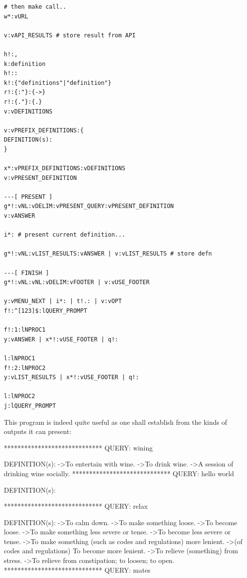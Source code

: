 \documentclass[a4paper, 18pt]{book} %
\begin{document}
{{{\begin{tcolorbox}[teaterminalstyle, title=TEA Application: Free Dictionary | LEXICON v1, breakable]
\begin{lstlisting}[language=TEA,breaklines=true,]
# then make call..
w*:vURL

v:vAPI_RESULTS # store result from API

h!:,
k:definition
h!::
k!:{"definitions"|"definition"}
r!:{:"}:{->}
r!:{."}:{.}
v:vDEFINITIONS

v:vPREFIX_DEFINITIONS:{
DEFINITION(s):
}

x*:vPREFIX_DEFINITIONS:vDEFINITIONS 
v:vPRESENT_DEFINITION

---[ PRESENT ]
g*!:vNL:vDELIM:vPRESENT_QUERY:vPRESENT_DEFINITION
v:vANSWER

i*: # present current definition...

g*!:vNL:vLIST_RESULTS:vANSWER | v:vLIST_RESULTS # store defn

---[ FINISH ]
g*!:vNL:vNL:vDELIM:vFOOTER | v:vUSE_FOOTER

y:vMENU_NEXT | i*: | t!.: | v:vOPT
f!:^[123]$:lQUERY_PROMPT

f!:1:lNPROC1
y:vANSWER | x*!:vUSE_FOOTER | q!:

l:lNPROC1
f!:2:lNPROC2
y:vLIST_RESULTS | x*!:vUSE_FOOTER | q!:

l:lNPROC2
j:lQUERY_PROMPT
   \end{lstlisting}
  \end{tcolorbox}
  \label{FIGTEALEXICON}

\vspace{1em}


This program is indeed quite useful as one shall establish from the kinds of outputs it can present:


 \vspace{2em}
 \begin{tcbverbatim}[title=Sample OUTPUT 1 from LEXICON v1 --- a list of definitions]

*****************************
QUERY: wining

DEFINITION(s):
->To entertain with wine.
->To drink wine.
->A session of drinking wine socially.
*****************************
QUERY: hello world

DEFINITION(s):

*****************************
QUERY: relax

DEFINITION(s):
->To calm down.
->To make something loose.
->To become loose.
->To make something less severe or tense.
->To become less severe or tense.
->To make something (such as codes and regulations) more lenient.
->(of codes and regulations) To become more lenient.
->To relieve (something) from stress.
->To relieve from constipation; to loosen; to open.
*****************************
QUERY: mates


\end{tcbverbatim}}}}
\end{document}
